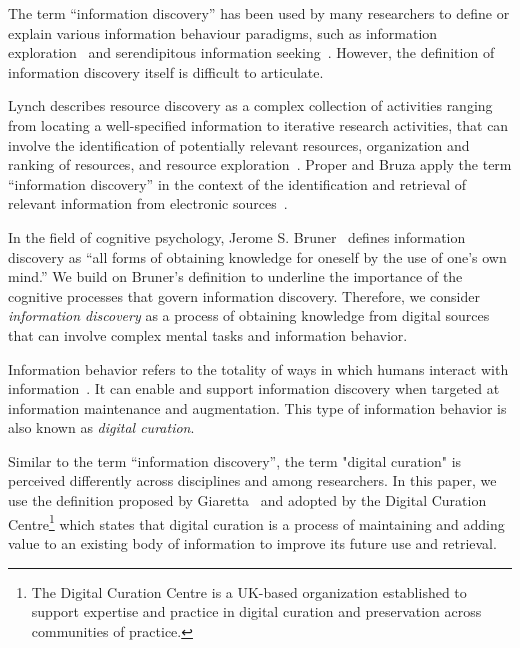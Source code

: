 \documentclass{sigchi}
\begin{document}
The term ``information discovery'' has been used by many researchers to define or explain various information behaviour paradigms, such as information exploration~\cite{waterworth1991model} and serendipitous information seeking~\cite{foster2003serendipity}. However, the definition of information discovery itself is difficult to articulate. 

Lynch describes resource discovery as a complex collection of activities ranging from locating a well-specified information to iterative research activities, that can involve the identification
of potentially relevant resources, organization and ranking of resources, and resource exploration~\cite{lynch1995networked}. Proper and Bruza apply the term ``information discovery'' in the context of  the identification and retrieval of relevant information from electronic sources~\cite{proper1999information}. 

In the field of cognitive psychology, Jerome S. Bruner~\cite{bruner1961act} defines information discovery as ``all forms of obtaining knowledge for oneself by the use of one's own mind.'' We build on Bruner's definition to underline the importance of the cognitive processes that govern information discovery. Therefore, we consider \textit{information discovery} as a process of obtaining knowledge from digital sources that can involve complex mental tasks and information behavior.  

Information behavior refers to the totality of ways in which humans interact with information~\cite{wilson2000human}. It can enable and support information discovery when targeted at information maintenance and augmentation. This type of information behavior is also known as \textit{digital curation}.

Similar to the term ``information discovery'', the term "digital curation" is perceived differently across disciplines and among researchers. In this paper, we use the definition proposed by Giaretta~\cite{giaretta2006dcc} and adopted by the Digital Curation Centre\footnote{The Digital Curation Centre is a UK-based organization established to support expertise and practice in digital curation and preservation across communities of practice.} which states that digital curation is a process of maintaining and adding value to an existing body of information to improve its future use and retrieval.   
\end{document}
